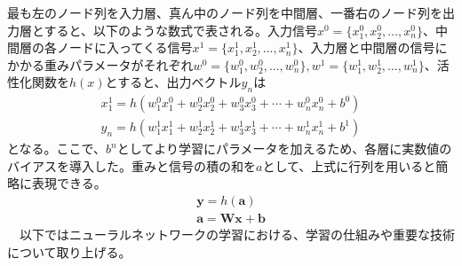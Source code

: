 最も左のノード列を入力層、真ん中のノード列を中間層、一番右のノード列を出力層とすると、以下のような数式で表される。入力信号$x^0 = \{ x_1^0, x_2^0, \ldots, x_n^0 \}$、中間層の各ノードに入ってくる信号$x^1 = \{ x_1^1, x_2^1, \ldots, x_n^1 \}$、入力層と中間層の信号にかかる重みパラメータがそれぞれ$w^0 = \{ w_1^0, w_2^0, \ldots, w_n^0 \}, w^1 = \{ w_1^1, w_2^1, \ldots, w_n^1 \}$、活性化関数を$h(x)$とすると、出力ベクトル$y_n$は
\begin{align}
x_1^1 = h(w_1^0 x_1^0 + w_2^0 x_2^0 + w_3^0 x_3^0 + \cdots + w_n^0 x_n^0 + b^0)\\
y_n = h(w_1^1 x_1^1 + w_2^1 x_2^1 + w_3^1 x_3^1 + \cdots + w_n^1 x_n^1 + b^1)
\end{align}
となる。ここで、$b^n$としてより学習にパラメータを加えるため、各層に実数値のバイアスを導入した。重みと信号の積の和を$a$として、上式に行列を用いると簡略に表現できる。
\begin{align}
\bm{y} = h(\bm{a})\\
\bm{a} = \bm{W} \bm{x} + \bm{b}
\end{align}
　以下ではニューラルネットワークの学習における、学習の仕組みや重要な技術について取り上げる。
